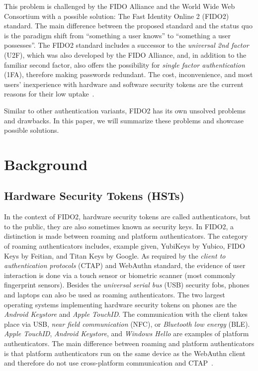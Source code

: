 \documentclass[runningheads]{llncs}
\begin{document}
This problem is challenged by the FIDO Alliance and the World Wide Web Consortium with a possible solution: The Fast Identity Online 2 (FIDO2) standard. The main difference between the proposed standard and the status quo is the paradigm shift from ``something a user knows'' to ``something a user possesses''. The FIDO2 standard includes a successor to the \textit{universal 2nd factor} (U2F), which was also developed by the FIDO Alliance, and, in addition to the familiar second factor, also offers the possibility for \textit{single factor authentication} (1FA), therefore making passwords redundant. The cost, inconvenience, and most users' inexperience with hardware and software security tokens are the current reasons for their low uptake~\cite{274547,9152694}.

Similar to other authentication variants, FIDO2 has its own unsolved problems and drawbacks. In this paper, we will summarize these problems and showcase possible solutions. 

\section{Background}
\subsection{Hardware Security Tokens (HSTs)}
In the context of FIDO2, hardware security tokens are called authenticators, but to the public, they are also sometimes known as security keys. In FIDO2, a distinction is made between roaming and platform authenticators. The category of roaming authenticators includes, example given, YubiKeys by Yubico, FIDO Keys by Feitian, and Titan Keys by Google. As required by the \textit{client to authentication protocols} (CTAP) and WebAuthn standard, the evidence of user interaction is done via a touch sensor or biometric scanner (most commonly fingerprint sensors). Besides the \textit{universal serial bus} (USB) security fobs, phones and laptops can also be used as roaming authenticators. The two largest operating systems implementing hardware security tokens on phones are the \textit{Android Keystore} and \textit{Apple TouchID}. The communication with the client takes place via USB, \textit{near field communication} (NFC), or \textit{Bluetooth low energy} (BLE).
\textit{Apple TouchID}, \textit{Android Keystore}, and \textit{Windows Hello} are examples of platform authenticators. The main difference between roaming and platform authenticators is that platform authenticators run on the same device as the WebAuthn client and therefore do not use cross-platform communication and CTAP~\cite{9152694}. 
\end{document}
